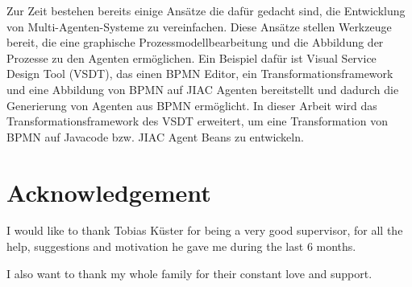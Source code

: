 Zur Zeit bestehen bereits einige Ans\"atze die daf\"ur gedacht sind, die Entwicklung von Multi-Agenten-Systeme zu vereinfachen. Diese Ans\"atze stellen Werkzeuge bereit, die eine graphische Prozessmodellbearbeitung und die Abbildung der Prozesse zu den Agenten erm\"oglichen. Ein Beispiel daf\"ur ist Visual Service Design Tool (VSDT), das einen BPMN Editor, ein Transformationsframework und eine Abbildung von BPMN auf JIAC Agenten bereitstellt und dadurch die Generierung von Agenten aus BPMN erm\"oglicht. In dieser Arbeit wird das Transformationsframework des VSDT erweitert, um eine Transformation von BPMN auf Javacode bzw. JIAC Agent Beans zu entwickeln. 

\newpage



\section*{Acknowledgement}
I would like to thank Tobias K\"uster for being a very good supervisor, for all the help, suggestions and motivation he gave me during the last 6 months.

I also want to thank my whole family for their constant love and support. 


